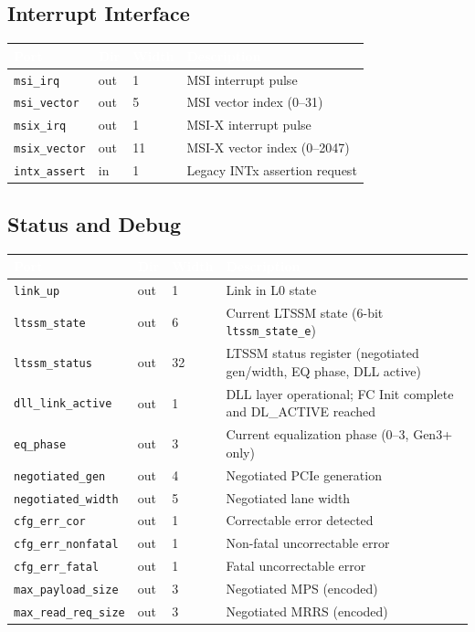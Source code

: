 \documentclass[11pt,a4paper]{article}
\newcommand{\theadcell}[1]{%
  \cellcolor{tablehead}\textcolor{white}{\textbf{#1}}}
\begin{document}
\subsection{Interrupt Interface}

\begin{tabular}{lllp{7.5cm}}
  \toprule
  \theadcell{Port} & \theadcell{Dir} & \theadcell{Width} & \theadcell{Description} \\
  \midrule
  \texttt{msi\_irq}     & out & 1  & MSI interrupt pulse \\
  \texttt{msi\_vector}  & out & 5  & MSI vector index (0--31) \\
  \texttt{msix\_irq}    & out & 1  & MSI-X interrupt pulse \\
  \texttt{msix\_vector} & out & 11 & MSI-X vector index (0--2047) \\
  \texttt{intx\_assert} & in  & 1  & Legacy INTx assertion request \\
  \bottomrule
\end{tabular}

\subsection{Status and Debug}

\begin{tabular}{lllp{7.5cm}}
  \toprule
  \theadcell{Port} & \theadcell{Dir} & \theadcell{Width} & \theadcell{Description} \\
  \midrule
  \texttt{link\_up}           & out & 1 & Link in L0 state \\
  \texttt{ltssm\_state}       & out & 6 & Current LTSSM state (6-bit \texttt{ltssm\_state\_e}) \\
  \texttt{ltssm\_status}      & out & 32 & LTSSM status register (negotiated gen/width, EQ phase, DLL active) \\
  \texttt{dll\_link\_active}  & out & 1 & DLL layer operational; FC Init complete and DL\_ACTIVE reached \\
  \texttt{eq\_phase}          & out & 3 & Current equalization phase (0--3, Gen3+ only) \\
  \texttt{negotiated\_gen}    & out & 4 & Negotiated PCIe generation \\
  \texttt{negotiated\_width}  & out & 5 & Negotiated lane width \\
  \texttt{cfg\_err\_cor}      & out & 1 & Correctable error detected \\
  \texttt{cfg\_err\_nonfatal} & out & 1 & Non-fatal uncorrectable error \\
  \texttt{cfg\_err\_fatal}    & out & 1 & Fatal uncorrectable error \\
  \texttt{max\_payload\_size} & out & 3 & Negotiated MPS (encoded) \\
  \texttt{max\_read\_req\_size}& out & 3 & Negotiated MRRS (encoded) \\
  \bottomrule
\end{tabular}
\end{document}
